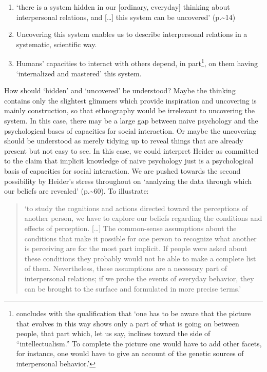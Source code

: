 \documentclass[12pt,\papersize]{extarticle}
\newif\iffoot
\let\origfootnote\footnote
\renewcommand{\footnote}[1]{\foottrue\origfootnote{#1}\footfalse}
\begin{document}
\begin{enumerate}
\def\labelenumi{\arabic{enumi}.}
\item
  `there is a system hidden in our {[}ordinary, everyday{]} thinking about interpersonal relations, and {[}\ldots{]} this system can be uncovered' (p.\textasciitilde14)
\item
  Uncovering this system enables us to describe interpersonal relations in a systematic, scientific way.
\item
  Humans' capacities to interact with others depend, in part\footnote{\citet[p.~298]{heider:1958_psychology} concludes with the qualification that `one has to be aware that the picture that evolves in this way shows only a part of what is going on between people, that part which, let us say, inclines toward the side of ``intellectualism.'' To complete the picture one would have to add other facets, for instance, one would have to give an account of the genetic sources of interpersonal behavior.'}, on them having `internalized and mastered' this system.
\end{enumerate}

How should `hidden' and `uncovered' be understood? Maybe the thinking contains only the slightest glimmers which provide inspiration and uncovering is mainly construction, so that ethnography would be irrelevant to uncovering the system. In this case, there may be a large gap between naive psychology and the psychological bases of capacities for social interaction. Or maybe the uncovering should be understood as merely tidying up to reveal things that are already present but not easy to see. In this case, we could interpret Heider as committed to the claim that implicit knowledge of naive psychology just is a psychological basis of capacities for social interaction. We are pushed towards the second possibility by Heider's stress throughout on `analyzing the data through which our beliefs are revealed' (p.\textasciitilde60). To illustrate:

\begin{quote}
`to study the cognitions and actions directed toward the perceptions of another person, we have to explore our beliefs regarding the conditions and effects of perception. {[}\ldots{]} The common-sense assumptions about the conditions that make it possible for one person to recognize what another is perceiving are for the most part implicit. If people were asked about these conditions they probably would not be able to make a complete list of them. Nevertheless, these assumptions are a necessary part of interpersonal relations; if we probe the events of everyday behavior, they can be brought to the surface and formulated in more precise terms.' \citep[p.~60]{heider:1958_psychology}
\end{quote}
\end{document}
